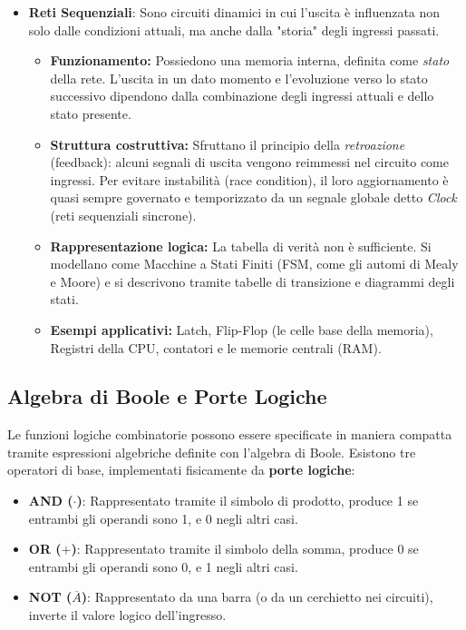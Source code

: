 \documentclass[12pt, a4paper]{article}
\begin{document}
\begin{itemize}
    \item \textbf{Reti Sequenziali}: Sono circuiti dinamici in cui l'uscita è influenzata non solo dalle condizioni attuali, ma anche dalla "storia" degli ingressi passati.
    \begin{itemize}
        \item \textbf{Funzionamento:} Possiedono una memoria interna, definita come \textit{stato} della rete. L'uscita in un dato momento e l'evoluzione verso lo stato successivo dipendono dalla combinazione degli ingressi attuali e dello stato presente.
        \item \textbf{Struttura costruttiva:} Sfruttano il principio della \textit{retroazione} (feedback): alcuni segnali di uscita vengono reimmessi nel circuito come ingressi. Per evitare instabilità (race condition), il loro aggiornamento è quasi sempre governato e temporizzato da un segnale globale detto \textit{Clock} (reti sequenziali sincrone).
        \item \textbf{Rappresentazione logica:} La tabella di verità non è sufficiente. Si modellano come Macchine a Stati Finiti (FSM, come gli automi di Mealy e Moore) e si descrivono tramite tabelle di transizione e diagrammi degli stati.
        \item \textbf{Esempi applicativi:} Latch, Flip-Flop (le celle base della memoria), Registri della CPU, contatori e le memorie centrali (RAM).
    \end{itemize}
\end{itemize}

\subsection{Algebra di Boole e Porte Logiche}
Le funzioni logiche combinatorie possono essere specificate in maniera compatta tramite espressioni algebriche definite con l'algebra di Boole. Esistono tre operatori di base, implementati fisicamente da \textbf{porte logiche}:
\begin{itemize}
    \item \textbf{AND ($\cdot$)}: Rappresentato tramite il simbolo di prodotto, produce 1 se entrambi gli operandi sono 1, e 0 negli altri casi.
    \item \textbf{OR ($+$)}: Rappresentato tramite il simbolo della somma, produce 0 se entrambi gli operandi sono 0, e 1 negli altri casi.
    \item \textbf{NOT ($\overline{A}$)}: Rappresentato da una barra (o da un cerchietto nei circuiti), inverte il valore logico dell'ingresso.
\end{itemize}
\end{document}
